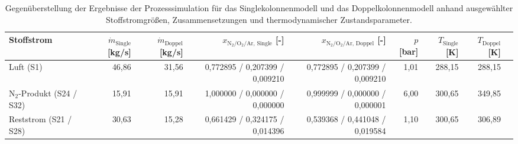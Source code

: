 \begin{longtable}{lrrrrrrrr}
\caption{Gegenüberstellung der Ergebnisse der Prozesssimulation für das Singlekolonnenmodell und das Doppelkolonnenmodell anhand ausgewählter Stoffstromgrößen, Zusammensetzungen und thermodynamischer Zustandsparameter.} \\
\hline
Stoffstrom & $\dot{m}_{\text{Single}}$ [kg/s] & $\dot{m}_{\text{Doppel}}$ [kg/s] & $x_{\text{N}_2/\text{O}_2/\text{Ar},\,\text{Single}}$ [-] & $x_{\text{N}_2/\text{O}_2/\text{Ar},\,\text{Doppel}}$ [-] & $p$ [bar] & $T_{\text{Single}}$ [K] & $T_{\text{Doppel}}$ [K] \\
\hline
Luft (S1) & 46,86 & 31,56 & 0,772895 / 0,207399 / 0,009210 & 0,772895 / 0,207399 / 0,009210 & 1,01 & 288,15 & 288,15 \\
N$_2$-Produkt (S24 / S32) & 15,91 & 15,91 & 1,000000 / 0,000000 / 0,000000 & 0,999999 / 0,000000 / 0,000001 & 6,00 & 300,65 & 349,85 \\
Reststrom (S21 / S28) & 30,63 & 15,28 & 0,661429 / 0,324175 / 0,014396 & 0,539368 / 0,441048 / 0,019584 & 1,10 & 300,65 & 306,89 \\
\hline
\end{longtable}